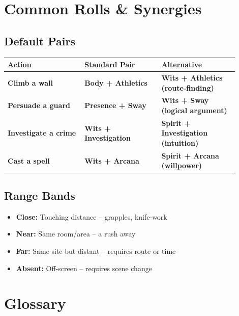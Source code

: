 \documentclass[10pt,twocolumn]{article}
\begin{document}
\section{Common Rolls \& Synergies}

\subsection{Default Pairs}
\begin{coretable}
\begin{tabular}{>{\bfseries}p{0.3\linewidth} >{\bfseries}p{0.3\linewidth} >{\bfseries}p{0.3\linewidth}}
\toprule
\textbf{Action} & \textbf{Standard Pair} & \textbf{Alternative} \\
\midrule
Climb a wall & Body + Athletics & Wits + Athletics (route-finding) \\
Persuade a guard & Presence + Sway & Wits + Sway (logical argument) \\
Investigate a crime & Wits + Investigation & Spirit + Investigation (intuition) \\
Cast a spell & Wits + Arcana & Spirit + Arcana (willpower) \\
\bottomrule
\end{tabular}
\end{coretable}

\subsection{Range Bands}
\begin{itemize}
    \item \textbf{Close:} Touching distance -- grapples, knife-work
    \item \textbf{Near:} Same room/area -- a rush away
    \item \textbf{Far:} Same site but distant -- requires route or time
    \item \textbf{Absent:} Off-screen -- requires scene change
\end{itemize}

\section{Glossary}
\end{document}
